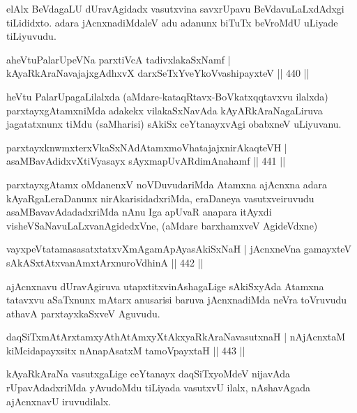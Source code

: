 \begin{artha}
elAlx BeVdagaLU dUravAgidadx vasutxvina savxrUpavu BeVdavuLaLxdAdxgi
tiLididxto. adara jAcnxnadiMdaleV adu adanunx biTuTx beVroMdU uLiyade tiLiyuvudu.
\end{artha}

\begin{shl}
aheVtuPalarUpeVNa parxtiVcA tadivxlakaSxNamf |
kAyaRkAraNavajajxgAdhxvX darxSeTxYveYkoV\s vashipayxteV \hfill  || 440 ||
\end{shl}

\begin{artha}
heVtu PalarUpagaLilalxda (aMdare-kataqRtavx-BoVkatxqqtavxvu ilalxda) parxtayxgAtamx\-niMda adakekx vilakaSxNavAda kAyARkAraNagaLiruva jagatatxnunx tiMdu (saMharisi) sAkiSx ceYtanayxvAgi obabxneV uLiyuvanu.
\end{artha}

\begin{shl}
parxtayxknwmxterxVkaSxNAdAtamxmoVhatajajxnirAkaqteVH |
asaMBavAdidxvXtiVyasayx sAyxmapUvARdimAnahamf \hfill  || 441 ||
\end{shl}

\begin{artha}
parxtayxgAtamx oMdanenxV noVDuvudariMda Atamxna ajAcnxna adara
kAyaRgaLeraDanunx nirAkarisidadxriMda, eraDaneya vasutxveiruvudu
asaMBavavAdadadxriMda nAnu Iga apUvaR anapara itAyxdi
visheVSaNavuLaLxvanAgidedxVne, (aMdare barxhamxveV AgideVdxne) 
\end{artha}

\begin{shl}
vayxpeVtatamasasatxtatxvXmAgamApAyasAkiSxNaH |
jAcnxneVna gamayxteV sAkASxtAtxvanAmxtArxnuroVdhinA \hfill  || 442 ||
\end{shl}

\begin{artha}
ajAcnxnavu dUravAgiruva utapxtitxvinAshagaLige  sAkiSxyAda Atamxna tatavxvu aSaTxnunx mAtarx anusarisi baruva jAcnxnadiMda neVra toVruvudu athavA parxtayxkaSxveV Aguvudu.
\end{artha}

\begin{shl}
daqSiTxmAtArxtamxyAthAtAmxyXtAkxyaRkAraNavasutxnaH |
nAjAcnxtaM kiMcidapayxsitx nAnapAsatxM tamoV\s payxtaH \hfill  || 443 ||
\end{shl}

\begin{artha}
kAyaRkAraNa vasutxgaLige ceYtanayx daqSiTxyoMdeV nijavAda rUpavAdadxriMda yAvudoMdu tiLiyada vasutxvU ilalx, nAshavAgada ajAcnxnavU iruvudilalx.
\end{artha}

